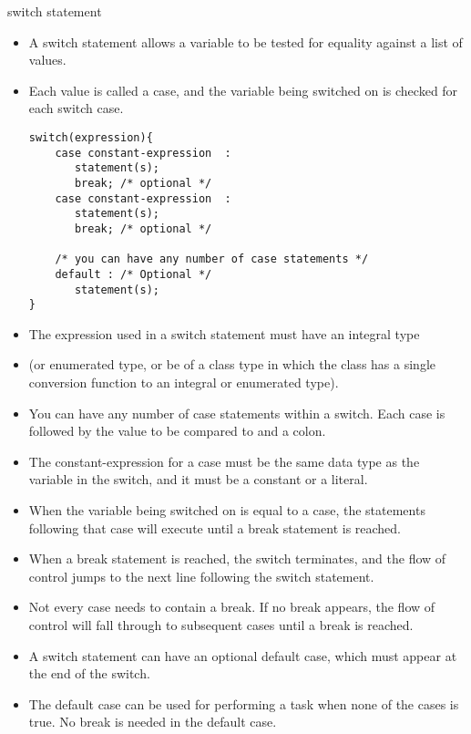 \documentclass[10pt,t]{beamer}
\begin{document}
\begin{frame}[fragile]{}
  
\end{frame}

\begin{frame}[fragile]{switch statement}
  \begin{itemize}
    \item A switch statement allows a variable to be tested for equality against a list of values. 
    \item Each value is called a case, and the variable being switched on is checked for each switch case.
      \begin{block}{}
        \begin{lstlisting}
switch(expression){
    case constant-expression  :
       statement(s);
       break; /* optional */
    case constant-expression  :
       statement(s);
       break; /* optional */
  
    /* you can have any number of case statements */
    default : /* Optional */
       statement(s);
}
        \end{lstlisting}
      \end{block}
  \end{itemize}
\end{frame}

\begin{frame}
  \begin{itemize}
    \item The expression used in a switch statement must have an integral type 
    \item[](or enumerated type, or be of a class type in which the class has a single conversion function to an integral or enumerated type).
    \item You can have any number of case statements within a switch. Each case is followed by the value to be compared to and a colon.
    \item The constant-expression for a case must be the same data type as the variable in the switch, and it must be a constant or a literal.
    \item When the variable being switched on is equal to a case, the statements following that case will execute until a break statement is reached.
    \item When a break statement is reached, the switch terminates, and the flow of control jumps to the next line following the switch statement.
    \item Not every case needs to contain a break. If no break appears, the flow of control will fall through to subsequent cases until a break is reached.
    \item A switch statement can have an optional default case, which must appear at the end of the switch. 
    \item The default case can be used for performing a task when none of the cases is true. No break is needed in the default case.
  \end{itemize}
  
\end{frame}
\end{document}
